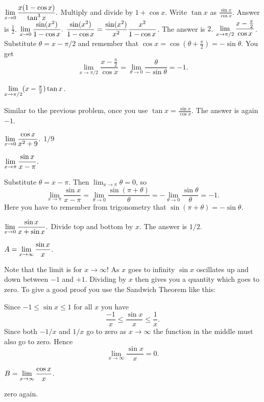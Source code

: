\begin{multicols}{3}
\problem $\displaystyle \lim_{x\to 0} \frac{x(1-\cos x)}{ \tan^3 x}.$ 
\answer 
Multiply and divide by $1+\cos x$.  Write $\tan x$ as $\frac{\sin x}{\cos x}$.
Answer is $\frac12$.
\endanswer
\problem $\displaystyle \lim_{x\to 0} \frac{\sin(x^2)}{ 1-\cos x}. $ 
\answer 
$\displaystyle \frac{\sin(x^2)}{ 1-\cos x} = \frac{\sin (x^2)}{x^2} \frac{x^2}{1-\cos x}$.
The answer is $2$.
\endanswer
\problem \(\displaystyle\lim_{x\to\pi/2}\frac{x-\tfrac\pi2}{\cos x}\). 
\answer 
Substitute \(\theta = x-\pi/2\) and remember that \(\cos x = \cos(\theta+\frac\pi2) = -\sin\theta\).  You get
\[
\lim_{x\to\pi/2}\frac{x-\tfrac\pi2}{\cos x} =\lim_{\theta\to0}
\frac{\theta}{-\sin\theta} = -1.
\]
\endanswer

\problem \(\displaystyle\lim_{x\to\pi/2}(x-\tfrac\pi2)\tan x\). 

\answer 
Similar to the previous problem, once you use \(\tan x = \frac{\sin
  x}{\cos x}\). The answer is again \(-1\).
\endanswer

\problem $\displaystyle \lim_{x\to 0}\frac{\cos x}{x^2+9}.$ 
\answer 
$1/9$
\endanswer

\problem $\displaystyle \lim_{x\to \pi}\frac{\sin x}{x-\pi}.$ 

\answer 
Substitute \(\theta = x-\pi\).  Then \(\lim_{x\to\pi}\theta=0\), so
\[
\lim_{x\to \pi}\frac{\sin x}{x-\pi} = \lim_{\theta\to0}
\frac{\sin(\pi+\theta)}{\theta} = -\lim_{\theta\to0}
\frac{\sin\theta}{\theta} = -1.
\]
Here you have to remember from trigonometry that \(\sin(\pi+\theta)
= -\sin\theta\).
\endanswer

\problem $\displaystyle \lim_{x\rightarrow 0}\frac{\sin x}{x+\sin x}.$ 
\answer 
Divide top and bottom by $x$.  The answer is $1/2$.
\endanswer

\problem \carefulnow $\displaystyle A = \lim_{x\to\infty} \frac{\sin x}{x}$. 

\answer 
Note that the limit is for \(x\to\infty\)!  As \(x\) goes to
infinity \(\sin x\) oscillates up and down between \(-1\) and
\(+1\).  Dividing by \(x\) then gives you a quantity which goes to
zero.  To give a good proof you use the Sandwich Theorem like this:
\smallskip

Since \(-1\le \sin x\le 1\) for all \(x\) you have
\[
\frac{-1}{x} \le \frac{\sin x}{x} \le \frac{1}{x}.
\]
Since both \(-1/x\) and \(1/x\) go to zero as \(x\to\infty\) the
function in the middle must also go to zero.  Hence
\[
\lim_{x\to\infty} \frac{\sin x}{x} = 0.
\]
\endanswer

\problem $\displaystyle B = \lim_{x\to\infty} \frac{\cos x}{x}$. 

\answer 
zero again.
\endanswer


\end{multicols}
